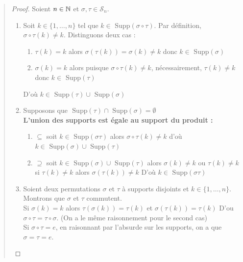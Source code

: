 \begin{quote}
	\footnotesize
	\begin{proof}
		Soient $n \in \mathbb{N}$ et $\sigma, \tau \in \mathcal{S}_n$.
		\begin{enumerate}
			\item Soit $k \in \{1,\dots,n\}$ tel que $ k \in \text{ Supp}(\sigma\circ\tau)$.
			Par définition, $\sigma \circ \tau (k) \not = k$. Distinguons deux cas :
				\begin{enumerate}
					\item $\tau(k) = k$ alors $\sigma (\tau(k)) = \sigma (k) \not = k$ donc $k \in \text{ Supp}(\sigma)$
					\item $\sigma(k) = k$ alors puisque $\sigma \circ \tau (k) \not = k$, nécessairement, $\tau (k) \not = k$ donc $k \in \text{ Supp}(\tau)$
				\end{enumerate}
				D'où $ k \in \text{ Supp}(\tau) \cup \text{ Supp}(\sigma)$
			\item Supposons que $\text{ Supp}(\tau) \cap \text{ Supp}(\sigma) = \emptyset$ \\ 
			\textbf{L'union des supports est égale au support du produit :}
			\begin{enumerate}
					\item $\boxed{\subseteq}$ soit $k \in \text{ Supp}(\sigma \tau)$ alors $\sigma \circ \tau (k) \not = k$
							d'où $k \in \text{ Supp}(\sigma) \cup \text{ Supp}(\tau)$
					\item $\boxed{\supseteq}$ soit $k \in \text{ Supp}(\sigma) \cup \text{ Supp}(\tau)$ alors $\sigma (k) \not = k$ ou $ \tau(k) \not = k$ 
							si $ \tau(k) \not = k $ alors $ \sigma(\tau(k)) \not = k$
							D'où $ k \in \text{ Supp}(\sigma \tau)$
			\end{enumerate}
			\item Soient deux permutations $\sigma$ et $\tau$ à supports disjoints et $k \in \{1,\dots,n\}$.
			Montrons que $\sigma$ et $\tau$ commutent. \\
			Si $\sigma(k)=k$ alors $\tau(\sigma(k))= \tau(k)$ et $\sigma(\tau(k)) = \tau(k)$
			D'ou $ \sigma \circ \tau = \tau \circ \sigma$. (On a le même raisonnement pour le second cas) \\
			Si $\sigma \circ \tau = e$, en raisonnant par l'absurde sur les supports, on a que $\sigma = \tau = e$.
		\end{enumerate}
	\end{proof}
	\normalsize
\end{quote}


